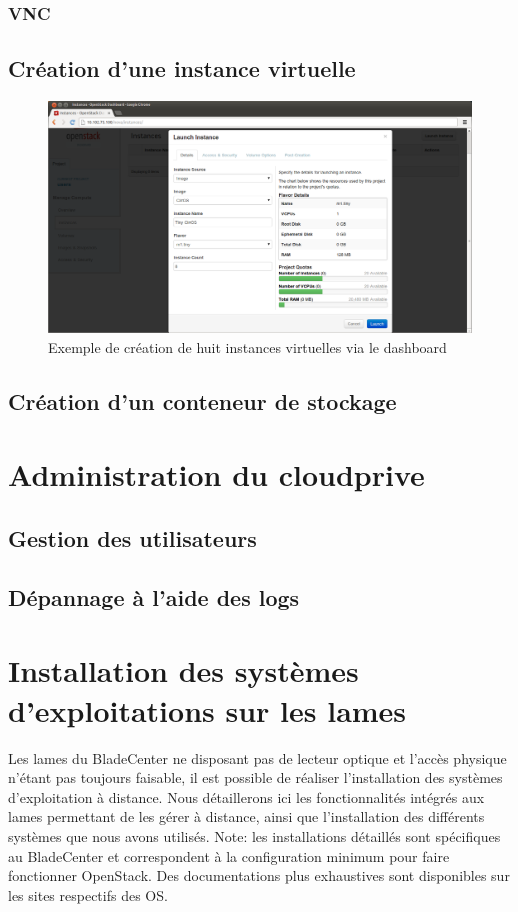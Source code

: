 \documentclass[a4paper,oneside]{report}
\begin{document}
\subsection{VNC}


\section{Création d'une instance virtuelle}
\begin{figure}[!h]
\centering
\includegraphics[resolution=200]{images/dashboard_create_details.png}
\caption{Exemple de création de huit instances virtuelles via le dashboard}
\end{figure}

\section{Création d'un conteneur de stockage}

\chapter{Administration du \gls{cloudprive}}

\section{Gestion des utilisateurs}

\section{Dépannage à l'aide des logs} 


\chapter{Installation des systèmes d'exploitations sur les lames} \label{sec:installos}
Les lames du BladeCenter ne disposant pas de lecteur optique et l'accès physique n'étant pas toujours faisable, il est possible de réaliser l'installation des systèmes d'exploitation à distance.
Nous détaillerons ici les fonctionnalités intégrés aux lames permettant de les gérer à distance, ainsi que l'installation des différents systèmes que nous avons utilisés.\newline
Note: les installations détaillés sont spécifiques au BladeCenter et correspondent à la configuration minimum pour faire fonctionner OpenStack. Des documentations plus exhaustives sont disponibles sur les sites respectifs des OS.
\end{document}
